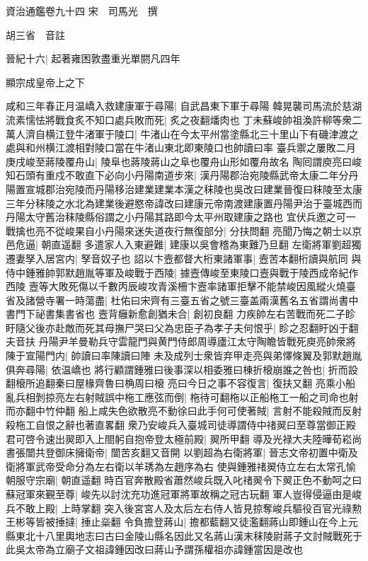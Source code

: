 資治通鑑卷九十四
宋　司馬光　撰

胡三省　音註

晉紀十六|{
	起著雍困敦盡重光單閼凡四年}


顯宗成皇帝上之下

咸和三年春正月温嶠入救建康軍于尋陽|{
	自武昌東下軍于尋陽}
韓晃襲司馬流於慈湖流素懦怯將戰食炙不知口處兵敗而死|{
	炙之夜翻燔肉也}
丁未蘇峻帥祖渙許柳等衆二萬人濟自横江登牛渚軍于陵口|{
	牛渚山在今太平州當塗縣北三十里山下有磯津渡之處與和州横江渡相對陵口當在牛渚山東北即東陵口也帥讀曰率}
臺兵禦之屢敗二月庚戌峻至蔣陵覆舟山|{
	陵阜也蔣陵蔣山之阜也覆舟山形如覆舟故名}
陶囘謂庾亮曰峻知石頭有重戍不敢直下必向小丹陽南道步來|{
	漢丹陽郡治宛陵縣武帝太康二年分丹陽置宣城郡治宛陵而丹陽移治建業建業本漢之秣陵也吳改曰建業晉復曰秣陵至太康三年分秣陵之水北為建業後避愍帝諱改曰建康元帝南渡建康置丹陽尹治于臺城西而丹陽太守舊治秣陵縣俗謂之小丹陽其路即今太平州取建康之路也}
宜伏兵邀之可一戰擒也亮不從峻果自小丹陽來迷失道夜行無復部分|{
	分扶問翻}
亮聞乃悔之朝士以京邑危逼|{
	朝直遥翻}
多遣家人入東避難|{
	建康以吳會稽為東難乃旦翻}
左衛將軍劉超獨遷妻孥入居宮内|{
	孥音奴子也}
詔以卞壼都督大桁東諸軍事|{
	壼苦本翻桁讀與航同}
與侍中鍾雅帥郭默趙胤等軍及峻戰于西陵|{
	據壼傳峻至東陵口壼與戰于陵西成帝紀作西陵}
壼等大敗死傷以千數丙辰峻攻青溪柵卞壼率諸軍拒擊不能禁峻因風縱火燒臺省及諸營寺署一時蕩盡|{
	杜佑曰宋齊有三臺五省之號三臺盖兩漢舊名五省謂尚書中書門下祕書集書省也}
壼背癰新愈創猶未合|{
	創初良翻}
力疾帥左右苦戰而死二子眕盱隨父後亦赴敵而死其母撫尸哭曰父為忠臣子為孝子夫何恨乎|{
	眕之忍翻盱凶于翻夫音扶}
丹陽尹羊曼勒兵守雲龍門與黄門侍郎周導廬江太守陶瞻皆戰死庾亮帥衆將陳于宣陽門内|{
	帥讀曰率陳讀曰陣}
未及成列士衆皆弃甲走亮與弟懌條翼及郭默趙胤俱奔尋陽|{
	依温嶠也}
將行顧謂鍾雅曰後事深以相委雅曰棟折榱崩誰之咎也|{
	折而設翻榱所追翻秦曰屋椽齊魯曰桷周曰榱}
亮曰今日之事不容復言|{
	復扶又翻}
亮乘小船亂兵相剝掠亮左右射賊誤中柂工應弦而倒|{
	柂待可翻柂以正船柂工一船之司命也射而亦翻中竹仲翻}
船上咸失色欲散亮不動徐曰此手何可使著賊|{
	言射不能殺賊而反射殺柂工自恨之辭也著直畧翻}
衆乃安峻兵入臺城司徒導謂侍中禇翜曰至尊當御正殿君可啓令速出翜即入上閤躬自抱帝登太極前殿|{
	翜所甲翻}
導及光禄大夫陸曄荀崧尚書張闓共登御床擁衛帝|{
	闓苦亥翻又音開}
以劉超為右衛將軍|{
	晉志文帝初置中衛及衛將軍武帝受命分為左右衛以羊琇為左趙序為右}
使與鍾雅禇翜侍立左右太常孔愉朝服守宗廟|{
	朝直遥翻}
時百官奔散殿省蕭然峻兵既入叱禇翜令下翜正色不動呵之曰蘇冠軍來覲至尊|{
	峻先以討沈充功進冠軍將軍故稱之冠古玩翻}
軍人豈得侵逼由是峻兵不敢上殿|{
	上時掌翻}
突入後宮宮人及太后左右侍人皆見掠奪峻兵驅役百官光祿勲王彬等皆被捶撻|{
	捶止橤翻}
令負擔登蔣山|{
	擔都藍翻又徒濫翻蔣山即鍾山在今上元縣東北十八里輿地志曰古曰金陵山縣名因此又名蔣山漢末秣陵尉蔣子文討賊戰死于此吳太帝為立廟子文祖諱鍾因改曰蔣山予謂孫權祖亦諱鍾當因是改也}
